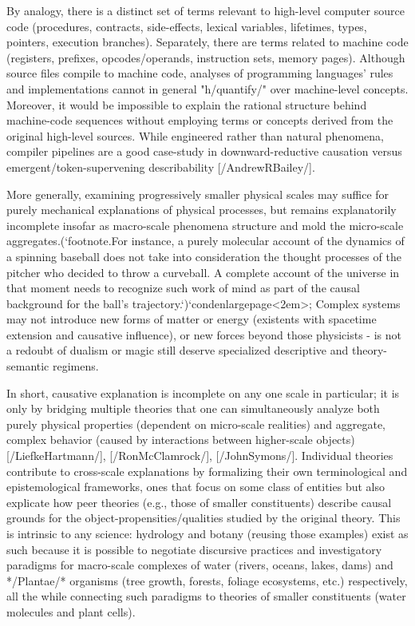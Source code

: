 By analogy, there is a distinct set of terms relevant to 
high-level computer source code (procedures, contracts, side-effects, 
lexical variables, lifetimes, types, pointers, execution branches).  
Separately, there are terms related to machine code (registers,  prefixes, 
opcodes/operands, instruction sets, memory pages).  Although source files compile
to machine code, analyses of programming languages' rules and 
implementations cannot in general "h/quantify/" over machine-level 
concepts.  Moreover, it would be impossible to explain the rational 
structure behind machine-code sequences without employing terms 
or concepts derived from the original high-level sources.  While 
engineered rather than natural phenomena, compiler pipelines are 
a good case-study in downward-reductive causation versus 
emergent/token-supervening describability [/AndrewRBailey/]. 
  
More generally, examining progressively smaller 
physical scales may suffice for purely mechanical explanations of 
physical processes, but remains explanatorily incomplete insofar 
as macro-scale phenomena structure and mold the micro-scale 
aggregates.(`footnote.For instance, a purely molecular account of the dynamics of a spinning 
baseball does not take into consideration the thought processes 
of the pitcher who decided to throw a curveball.  A complete 
account of the universe in that moment needs to recognize such 
work of mind as part of the causal background for the ball's 
trajectory.`)`condenlargepage<2em>;  Complex systems may not introduce new forms of matter or energy 
(existents with spacetime extension and causative influence), 
or new forces beyond those physicists -%
is not a redoubt of dualism or magic %
still deserve specialized descriptive and theory-semantic regimens.

In short, causative explanation is incomplete on any one scale in 
particular; it is only by bridging multiple theories that one can 
simultaneously analyze both purely physical properties (dependent 
on micro-scale realities) and aggregate, complex behavior 
(caused by interactions between higher-scale objects)  
[/LiefkeHartmann/], [/RonMcClamrock/], [/JohnSymons/].  Individual 
theories contribute to cross-scale explanations by formalizing 
their own terminological and epistemological frameworks, ones 
that focus on some class of entities but also explicate how 
peer theories (e.g., those of smaller constituents) describe 
causal grounds for the object-propensities/qualities studied by 
the original theory.  This is intrinsic to any science: hydrology 
and botany (reusing those examples) exist as such because it 
is possible to negotiate discursive practices and investigatory paradigms 
for macro-scale complexes of water (rivers, oceans, lakes, dams) 
and */Plantae/* organisms (tree growth, forests, foliage ecosystems, etc.) respectively, all the 
while connecting such paradigms to theories of smaller constituents 
(water molecules and plant cells).

